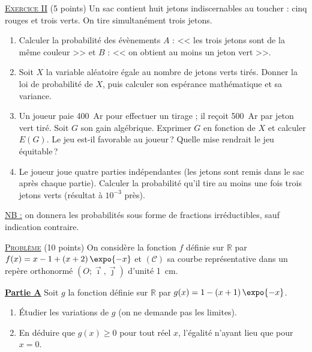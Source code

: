 \noindent \underline{\textsc{Exercice II}} (5 points) \newline
Un sac contient huit jetons indiscernables au toucher : cinq rouges et trois verts. On tire simultan\'ement trois jetons.
\begin{enumerate}
      \item Calculer la probabilit\'e des \'ev\`enements $A$ : << les trois jetons sont de la m\^eme couleur >> et
            $B$ : << on obtient au moins un jeton vert >>.
      \item Soit $X$ la variable al\'eatoire \'egale au nombre de jetons verts tir\'es.
            Donner la loi de probabilit\'e de $X$, puis calculer son esp\'erance math\'ematique et sa variance.
      \item Un joueur paie 400~Ar pour effectuer un tirage ; il re\c{c}oit 500~Ar par jeton vert tir\'e.
            Soit $G$ son gain alg\'ebrique. Exprimer $G$ en fonction de $X$ et calculer $E(G)$. Le jeu est-il favorable au joueur\,?
            Quelle mise rendrait le jeu \'equitable\,?
      \item Le joueur joue quatre parties ind\'ependantes (les jetons sont remis dans le sac apr\`es chaque partie).
            Calculer la probabilit\'e qu'il tire au moins une fois trois jetons verts (r\'esultat \`a $10^{-3}$ pr\`es).
\end{enumerate}
\noindent\underline{NB :} on donnera les probabilit\'es sous forme de fractions irr\'eductibles, sauf indication contraire.

\noindent \underline{\textsc{Probl\`eme}} (10 points) \newline
On consid\`ere la fonction $f$ d\'efinie sur $\mathbb{R}$ par $f(x) = x - 1 + (x+2)\,\expo{-x}$ et $(\mathscr{C})$ sa courbe
repr\'esentative dans un rep\`ere orthonorm\'e $(O ; \vec{\imath}, \vec{\jmath})$ d'unit\'e 1~cm.

\underline{\textbf{Partie A}} \newline
Soit $g$ la fonction d\'efinie sur $\mathbb{R}$ par $g(x) = 1 - (x+1)\,\expo{-x}$.
\begin{enumerate}
      \item \'Etudier les variations de $g$ (on ne demande pas les limites).
      \item En d\'eduire que $g(x) \geq 0$ pour tout r\'eel $x$, l'\'egalit\'e n'ayant lieu que pour $x = 0$.
\end{enumerate}


